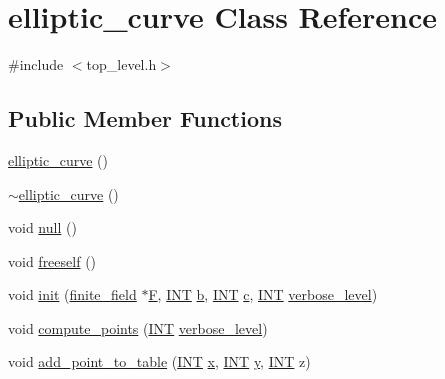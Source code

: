 \hypertarget{classelliptic__curve}{}\section{elliptic\+\_\+curve Class Reference}
\label{classelliptic__curve}


{\ttfamily \#include $<$top\+\_\+level.\+h$>$}

\subsection*{Public Member Functions}
\begin{DoxyCompactItemize}
\item 
\mbox{\hyperlink{classelliptic__curve_ae1ce376e47410f2845e5fd3c59b5296d}{elliptic\+\_\+curve}} ()
\item 
\mbox{\hyperlink{classelliptic__curve_a087cbee00624368ff64a68ce7100b09f}{$\sim$elliptic\+\_\+curve}} ()
\item 
void \mbox{\hyperlink{classelliptic__curve_a9f4125b14561601e03c85903673f4d16}{null}} ()
\item 
void \mbox{\hyperlink{classelliptic__curve_af552b2de089253cf968d1dcf63394d18}{freeself}} ()
\item 
void \mbox{\hyperlink{classelliptic__curve_a0146cb7d2585f1e15e49d77a7496190f}{init}} (\mbox{\hyperlink{classfinite__field}{finite\+\_\+field}} $\ast$\mbox{\hyperlink{classelliptic__curve_a2b4a8140101de7fe21ef774497372c94}{F}}, \mbox{\hyperlink{galois_8h_a09fddde158a3a20bd2dcadb609de11dc}{I\+NT}} \mbox{\hyperlink{classelliptic__curve_ade70b18ed97add66f8811cb584ad1915}{b}}, \mbox{\hyperlink{galois_8h_a09fddde158a3a20bd2dcadb609de11dc}{I\+NT}} \mbox{\hyperlink{classelliptic__curve_a540307713774a2f3b7aaf5ffabeb1678}{c}}, \mbox{\hyperlink{galois_8h_a09fddde158a3a20bd2dcadb609de11dc}{I\+NT}} \mbox{\hyperlink{simeon_8_c_a818073fbcc2f439e7c56952f67386122}{verbose\+\_\+level}})
\item 
void \mbox{\hyperlink{classelliptic__curve_a07f848c282b8e731d9e99e9b358d5a9a}{compute\+\_\+points}} (\mbox{\hyperlink{galois_8h_a09fddde158a3a20bd2dcadb609de11dc}{I\+NT}} \mbox{\hyperlink{simeon_8_c_a818073fbcc2f439e7c56952f67386122}{verbose\+\_\+level}})
\item 
void \mbox{\hyperlink{classelliptic__curve_a2690f776fb20537f5bab2235cdb13f1a}{add\+\_\+point\+\_\+to\+\_\+table}} (\mbox{\hyperlink{galois_8h_a09fddde158a3a20bd2dcadb609de11dc}{I\+NT}} \mbox{\hyperlink{alphabet2_8_c_a6150e0515f7202e2fb518f7206ed97dc}{x}}, \mbox{\hyperlink{galois_8h_a09fddde158a3a20bd2dcadb609de11dc}{I\+NT}} \mbox{\hyperlink{alphabet2_8_c_a0a2f84ed7838f07779ae24c5a9086d33}{y}}, \mbox{\hyperlink{galois_8h_a09fddde158a3a20bd2dcadb609de11dc}{I\+NT}} z)

\end{DoxyCompactItemize}
